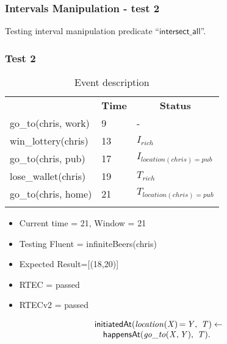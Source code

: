\documentclass[8pt]{beamer}
\DeclareMathOperator{\val}{=}  %
\def \patsize {}
\def\happensAt{\textsf{\patsize happensAt}}
\def\initiatedAt{\textsf{\patsize initiatedAt}}
\def\intersectall{\textsf{\patsize intersect\_all}}
\newenvironment{mysplit}%
  {\arraycolsep 0pt \begin{array}{l}}%
  {\end{array}}
\begin{document}
\begin{frame}
    \frametitle{Intervals Manipulation - test 2}
    \small Testing interval manipulation predicate ``$\intersectall$''.\linebreak
    \subsubsection{Test 2}
    \begin{minipage}{0.48\linewidth}
        \begin{table}[t!]
            \caption{Event description}
            \begin{center}

                \begin{tabular}{lll}
                    \hline\noalign{\smallskip}
                    \multicolumn{1}{l}{\textbf{Event}} & \multicolumn{1}{c}{\textbf{Time}} & \multicolumn{1}{c}{\textbf{Status}}   \\
                    go\_to(chris, work)& 9 & -\\
                    win\_lottery(chris)& 13 & $I_{rich}$\\
                    go\_to(chris, pub)& 17 & $I_{location(chris)=pub}$\\
                    lose\_wallet(chris)& 19 & $T_{rich}$ \\
                    go\_to(chris, home)& 21 & $T_{location(chris)=pub}$\\
                    \noalign{\smallskip}
                    \hline
                \end{tabular}
            \end{center}
        \end{table}

        \begin{itemize}
            \item Current time = 21, Window = 21
            \item Testing Fluent = infiniteBeers(chris)
            \item Expected Result=[(18,20)]
            \item RTEC = passed
            \item RTECv2 = passed
        \end{itemize}
    \end{minipage}
    \begin{minipage}{0.48\linewidth}

        \begin{align*}
            \begin{mysplit}
                \initiatedAt\mathit{(location(X)\val Y,\ T) \leftarrow}\\
                \quad    \happensAt\mathit{(go\_to(X,Y),\ T).}
            \end{mysplit}
        \end{align*}


\end{minipage}
\end{frame}
\end{document}
